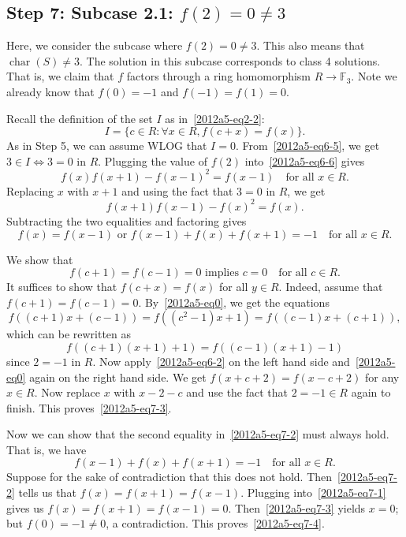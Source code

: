 \documentclass{article}
\newcommand{\F}{\mathbb{F}}
\DeclareMathOperator{\rchar}{char}
\begin{document}
\subsection*{Step 7: Subcase 2.1: $f(2) = 0 \neq 3$}

Here, we consider the subcase where $f(2) = 0 \neq 3$.
This also means that $\rchar(S) \neq 3$.
The solution in this subcase corresponds to class 4 solutions.
That is, we claim that $f$ factors through a ring homomorphism $R \to \F_3$.
Note we already know that $f(0) = -1$ and $f(-1) = f(1) = 0$.

Recall the definition of the set $I$ as in~\eqref{2012a5-eq2-2}:
\[ I = \{c \in R : \forall x \in R, f(c + x) = f(x)\}. \]
As in Step 5, we can assume WLOG that $I = 0$.
From~\eqref{2012a5-eq6-5}, we get $3 \in I \iff 3 = 0$ in $R$.
Plugging the value of $f(2)$ into~\eqref{2012a5-eq6-6} gives
\[ f(x) f(x + 1) - f(x - 1)^2 = f(x - 1) \quad \text{for all } x \in R. \tag{7.1}\label{2012a5-eq7-1} \]
Replacing $x$ with $x + 1$ and using the fact that $3 = 0$ in $R$, we get
\[ f(x + 1) f(x - 1) - f(x)^2 = f(x). \]
Subtracting the two equalities and factoring gives
\[ f(x) = f(x - 1) \text{ or } f(x - 1) + f(x) + f(x + 1) = -1 \quad \text{for all } x \in R. \tag{7.2}\label{2012a5-eq7-2} \]

We show that
\[ f(c + 1) = f(c - 1) = 0 \text{ implies } c = 0 \quad \text{for all } c \in R. \tag{7.3}\label{2012a5-eq7-3} \]
It suffices to show that $f(c + x) = f(x)$ for all $y \in R$.
Indeed, assume that $f(c + 1) = f(c - 1) = 0$.
By~\eqref{2012a5-eq0}, we get the equations
\[ f((c + 1) x + (c - 1)) = f((c^2 - 1) x + 1) = f((c - 1) x + (c + 1)), \]
    which can be rewritten as
\[ f((c + 1)(x + 1) + 1) = f((c - 1)(x + 1) - 1) \]
    since $2 = -1$ in $R$.
Now apply~\eqref{2012a5-eq6-2} on the left hand side and~\eqref{2012a5-eq0} again on the right hand side.
We get $f(x + c + 2) = f(x - c + 2)$ for any $x \in R$.
Now replace $x$ with $x - 2 - c$ and use the fact that $2 = -1 \in R$ again to finish.
This proves~\eqref{2012a5-eq7-3}.

Now we can show that the second equality in~\eqref{2012a5-eq7-2} must always hold.
That is, we have
\[ f(x - 1) + f(x) + f(x + 1) = -1 \quad \text{for all } x \in R. \tag{7.4}\label{2012a5-eq7-4} \]
Suppose for the sake of contradiction that this does not hold.
Then~\eqref{2012a5-eq7-2} tells us that $f(x) = f(x + 1) = f(x - 1)$.
Plugging into~\eqref{2012a5-eq7-1} gives us $f(x) = f(x + 1) = f(x - 1) = 0$.
Then~\eqref{2012a5-eq7-3} yields $x = 0$; but $f(0) = -1 \neq 0$, a contradiction.
This proves~\eqref{2012a5-eq7-4}.
\end{document}
